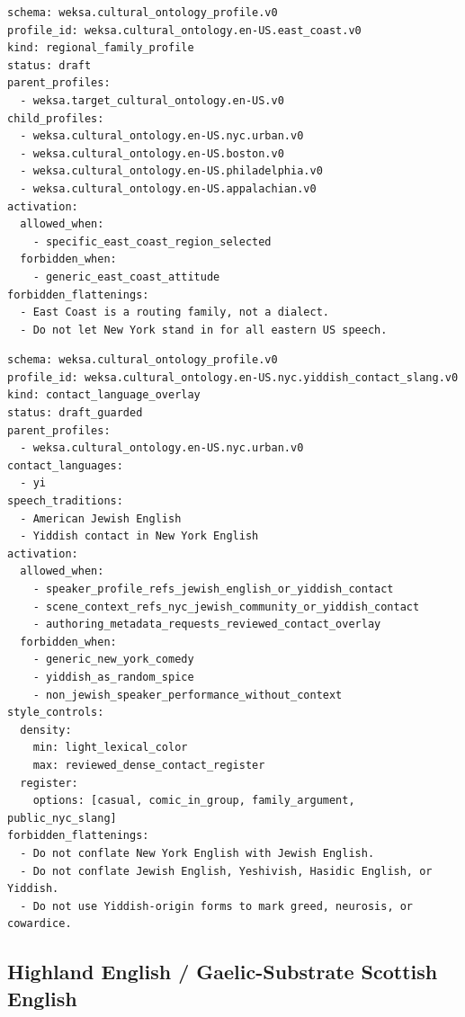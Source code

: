 \documentclass[11pt]{article}
\begin{document}
\begin{lstlisting}[basicstyle=\ttfamily\small,breaklines=true]
schema: weksa.cultural_ontology_profile.v0
profile_id: weksa.cultural_ontology.en-US.east_coast.v0
kind: regional_family_profile
status: draft
parent_profiles:
  - weksa.target_cultural_ontology.en-US.v0
child_profiles:
  - weksa.cultural_ontology.en-US.nyc.urban.v0
  - weksa.cultural_ontology.en-US.boston.v0
  - weksa.cultural_ontology.en-US.philadelphia.v0
  - weksa.cultural_ontology.en-US.appalachian.v0
activation:
  allowed_when:
    - specific_east_coast_region_selected
  forbidden_when:
    - generic_east_coast_attitude
forbidden_flattenings:
  - East Coast is a routing family, not a dialect.
  - Do not let New York stand in for all eastern US speech.
\end{lstlisting}

\begin{lstlisting}[basicstyle=\ttfamily\small,breaklines=true]
schema: weksa.cultural_ontology_profile.v0
profile_id: weksa.cultural_ontology.en-US.nyc.yiddish_contact_slang.v0
kind: contact_language_overlay
status: draft_guarded
parent_profiles:
  - weksa.cultural_ontology.en-US.nyc.urban.v0
contact_languages:
  - yi
speech_traditions:
  - American Jewish English
  - Yiddish contact in New York English
activation:
  allowed_when:
    - speaker_profile_refs_jewish_english_or_yiddish_contact
    - scene_context_refs_nyc_jewish_community_or_yiddish_contact
    - authoring_metadata_requests_reviewed_contact_overlay
  forbidden_when:
    - generic_new_york_comedy
    - yiddish_as_random_spice
    - non_jewish_speaker_performance_without_context
style_controls:
  density:
    min: light_lexical_color
    max: reviewed_dense_contact_register
  register:
    options: [casual, comic_in_group, family_argument, public_nyc_slang]
forbidden_flattenings:
  - Do not conflate New York English with Jewish English.
  - Do not conflate Jewish English, Yeshivish, Hasidic English, or Yiddish.
  - Do not use Yiddish-origin forms to mark greed, neurosis, or cowardice.
\end{lstlisting}

\subsection{Highland English / Gaelic-Substrate Scottish English}
\end{document}
